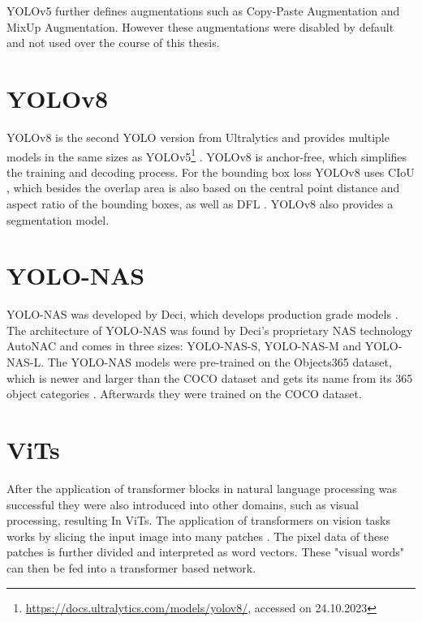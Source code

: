 \documentclass[10pt]{book}
\begin{document}
\ac{YOLO}v5 further defines augmentations such as Copy-Paste Augmentation and MixUp Augmentation. However these augmentations were disabled by default and not used over the course of this thesis.

\section{YOLOv8}

\ac{YOLO}v8 is the second \ac{YOLO} version from Ultralytics and provides multiple models in the same sizes as \ac{YOLO}v5\footnote{\url{https://docs.ultralytics.com/models/yolov8/}, accessed on 24.10.2023} \cite{terven2023comprehensive}. \ac{YOLO}v8 is anchor-free, which simplifies the training and decoding process. For the bounding box loss \ac{YOLO}v8 uses \ac{CIoU} \cite{zheng2020distance}, which besides the overlap area is also based on the central point distance and aspect ratio of the bounding boxes, as well as \ac{DFL} \cite{li2020generalized}. \ac{YOLO}v8 also provides a segmentation model.

\section{YOLO-NAS}

\ac{YOLO}-NAS was developed by Deci, which develops production grade models \cite{terven2023comprehensive}. The architecture of \ac{YOLO}-NAS was found by Deci's proprietary \ac{NAS} technology AutoNAC and comes in three sizes: \ac{YOLO}-NAS-S, \ac{YOLO}-NAS-M and \ac{YOLO}-NAS-L. The \ac{YOLO}-NAS models were pre-trained on the Objects365 dataset, which is newer and larger than the COCO dataset and gets its name from its 365 object categories \cite{shao2019objects365}. Afterwards they were trained on the COCO dataset.


\section{ViTs}

After the application of transformer blocks in natural language processing was successful they were also introduced into other domains, such as visual processing, resulting In \acp{ViT}. The application of transformers on vision tasks works by slicing the input image into many patches \cite{dosovitskiy2020image}. The pixel data of these patches is  further divided and interpreted as word vectors. These "visual words" can then be fed into a transformer based network. 
\end{document}
